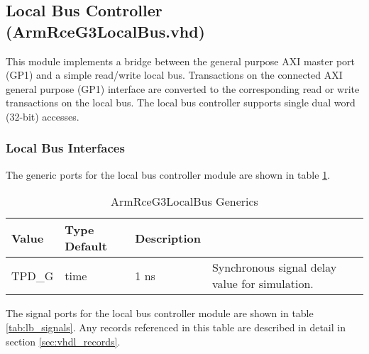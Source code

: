 \documentclass[11pt]{article}
\begin{document}
\subsection{Local Bus Controller (ArmRceG3LocalBus.vhd)}
\label{subsec:ArmRceG3LocalBus}

This module implements a bridge between the general purpose AXI master port (GP1) and a simple read/write local bus. 
Transactions on the connected AXI general purpose (GP1) interface are converted to the corresponding read or write transactions on the local bus. 
The local bus controller supports single dual word (32-bit) accesses.

\subsubsection{Local Bus Interfaces}

The generic ports for the local bus controller module are shown in table \ref{tab:lb_generics}.

\begin{table}[H]
\small
\centering
   \begin{tabular}{| l | l | l | l | }
      \hline \textbf{Value} & \textbf{Type} \textbf{Default} & \textbf{Description} \\
      \hline TPD\_G          & time    & 1 ns & Synchronous signal delay value for simulation.   \\
      \hline
   \end{tabular}
   \caption{ArmRceG3LocalBus Generics}
   \label{tab:lb_generics}
\end{table}

The signal ports for the local bus controller module are shown in table \ref{tab:lb_signals}.
Any records referenced in this table are described in detail in section \ref{sec:vhdl_records}. 
\end{document}

